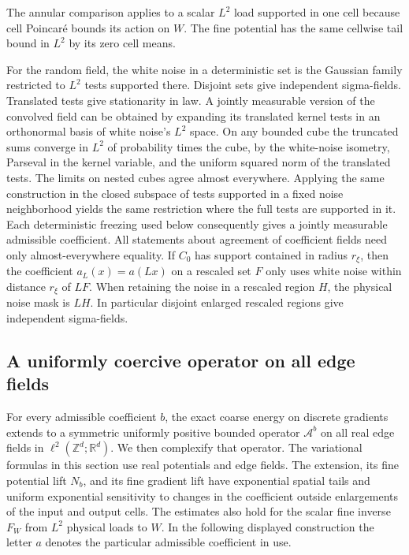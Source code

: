 \documentclass[11pt]{article}
\begin{document}
The annular comparison applies to a scalar \(L^2\) load supported in one cell because cell Poincaré bounds its action on \(W\). The fine potential has the same cellwise tail bound in \(L^2\) by its zero cell means.

For the random field, the white noise in a deterministic set is the Gaussian family restricted to \(L^2\) tests supported there. Disjoint sets give independent sigma-fields. Translated tests give stationarity in law. A jointly measurable version of the convolved field can be obtained by expanding its translated kernel tests in an orthonormal basis of white noise's \(L^2\) space. On any bounded cube the truncated sums converge in \(L^2\) of probability times the cube, by the white-noise isometry, Parseval in the kernel variable, and the uniform squared norm of the translated tests. The limits on nested cubes agree almost everywhere. Applying the same construction in the closed subspace of tests supported in a fixed noise neighborhood yields the same restriction where the full tests are supported in it. Each deterministic freezing used below consequently gives a jointly measurable admissible coefficient. All statements about agreement of coefficient fields need only almost-everywhere equality. If \(C_0\) has support contained in radius \(r_\xi\), then the coefficient \(a_L(x)=a(Lx)\) on a rescaled set \(F\) only uses white noise within distance \(r_\xi\) of \(LF\). When retaining the noise in a rescaled region \(H\), the physical noise mask is \(LH\). In particular disjoint enlarged rescaled regions give independent sigma-fields.

\subsection{A uniformly coercive operator on all edge fields}\label{subsec:edges}

For every admissible coefficient \(b\), the exact coarse energy on discrete gradients extends to a symmetric uniformly positive bounded operator \(\mathcal A^b\) on all real edge fields in \(\ell^2(\mathbb Z^d;\mathbb R^d)\). We then complexify that operator. The variational formulas in this section use real potentials and edge fields. The extension, its fine potential lift \(N_b\), and its fine gradient lift have exponential spatial tails and uniform exponential sensitivity to changes in the coefficient outside enlargements of the input and output cells. The estimates also hold for the scalar fine inverse \(F_W\) from \(L^2\) physical loads to \(W\). In the following displayed construction the letter \(a\) denotes the particular admissible coefficient in use.
\end{document}
